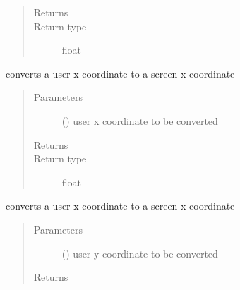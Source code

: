 \documentclass[letterpaper,10pt,english]{sphinxmanual}
\begin{document}
\begin{fulllineitems}
\begin{fulllineitems}
\begin{quote}
\begin{description}
\item[{Returns}] \leavevmode
{}

\item[{Return type}] \leavevmode
float

\end{description}\end{quote}

\end{fulllineitems}


\begin{fulllineitems}
\label{\detokenize{Reference:salabim.Environment.user_to_screencoordinates_x}}
converts a user x coordinate to a screen x coordinate
\begin{quote}\begin{description}
\item[{Parameters}] \leavevmode
{} () \textendash{} user x coordinate to be converted

\item[{Returns}] \leavevmode
{}

\item[{Return type}] \leavevmode
float

\end{description}\end{quote}

\end{fulllineitems}


\begin{fulllineitems}
\label{\detokenize{Reference:salabim.Environment.user_to_screencoordinates_y}}
converts a user x coordinate to a screen x coordinate
\begin{quote}\begin{description}
\item[{Parameters}] \leavevmode
{} () \textendash{} user y coordinate to be converted

\item[{Returns}] \leavevmode
{}


\end{description}
\end{quote}
\end{fulllineitems}
\end{fulllineitems}
\end{document}
